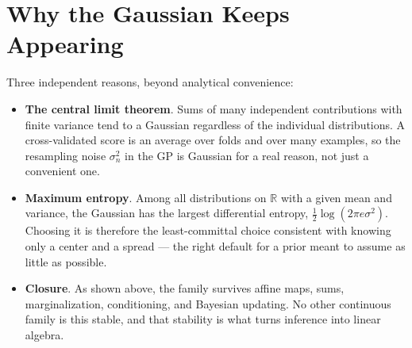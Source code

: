 \documentclass[conference]{IEEEtran}
\begin{document}
\section*{Why the Gaussian Keeps Appearing}
Three independent reasons, beyond analytical convenience:
\begin{itemize}
    \item \textbf{The central limit theorem}. Sums of many independent contributions with finite variance tend to a Gaussian regardless of the individual distributions. A cross-validated score is an average over folds and over many examples, so the resampling noise $\sigma_n^2$ in the GP is Gaussian for a real reason, not just a convenient one.
    \item \textbf{Maximum entropy}. Among all distributions on $\mathbb{R}$ with a given mean and variance, the Gaussian has the largest differential entropy, $\tfrac{1}{2}\log(2\pi e\sigma^2)$. Choosing it is therefore the least-committal choice consistent with knowing only a center and a spread --- the right default for a prior meant to assume as little as possible.
    \item \textbf{Closure}. As shown above, the family survives affine maps, sums, marginalization, conditioning, and Bayesian updating. No other continuous family is this stable, and that stability is what turns inference into linear algebra.
\end{itemize}
\end{document}
